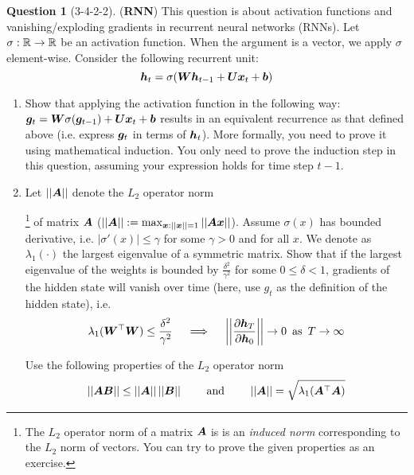 \documentclass[12pt]{article}
\theoremstyle{definition}
\newtheorem{exercise}{Question}%
\newcommand{\staritem}{
\addtocounter{enumi}{1}
\item[$\phantom{x}^{*}$\theenumi]}
\begin{document}
\begin{exercise} [3-4-2-2] (\textbf{RNN})
    \label{ex:rnn_spectral}
    This question is about activation functions and vanishing/exploding gradients in recurrent neural networks (RNNs). Let $\sigma:\mathbb{R}\rightarrow\mathbb{R}$ be an activation function. 
    When the argument is a vector, we apply $\sigma$ element-wise. 
    Consider the following recurrent unit:
    $${\bm{h}}_t = \sigma({\bm{W}} {\bm{h}}_{t-1} + {\bm{U}}{\bm{x}}_t + {\bm{b}})$$
    \begin{enumerate}[label=\arabic{exercise}.\arabic*]
        \item Show that applying the activation function in the following way: ${\bm{g}}_t = {\bm{W}}\sigma({\bm{g}}_{t-1}) + {\bm{U}}{\bm{x}}_t + {\bm{b}}$ results  in an equivalent recurrence as that defined above (i.e. express ${\bm{g}}_t$ in terms of ${\bm{h}}_t$).
        More formally, you need to prove it using mathematical induction. 
        You only need to prove the induction step in this question, assuming your expression holds for time step $t-1$.
        \item
        Let $||{\bm{A}}||$ denote the $L_2$ operator norm
        
        \footnote{
        The $L_2$ operator norm of a matrix ${\bm{A}}$ is is an \textit{induced norm} corresponding to the $L_2$ norm of vectors. 
        You can try to prove the given properties as an exercise.
        }
        of matrix ${\bm{A}}$ ($||{\bm{A}}||:=\max_{{\bm{x}}:||{\bm{x}}||=1}||{\bm{A}}{\bm{x}}||$). 
        Assume $\sigma(x)$ has bounded derivative, i.e. $|\sigma'(x)|\leq \gamma$ for some $\gamma>0$ and for all $x$. We denote as $\lambda_1(\cdot)$ the largest eigenvalue of a symmetric matrix. Show that if the largest eigenvalue of the weights is bounded by $\frac{\delta^2}{\gamma^2}$ for some $0 \leq \delta < 1$, gradients of the hidden state will vanish over time (here, use $g_t$ as the definition of the hidden state),    
         i.e.  
        $$\lambda_1({\bm{W}}^\top{\bm{W}})\leq\frac{\delta^2}{\gamma^2} \quad\implies\quad \bigg{|}\bigg{|}\frac{\partial{\bm{h}}_T}{\partial{\bm{h}}_0}\bigg{|}\bigg{|}  \rightarrow0 \,\text{ as }\,T\rightarrow\infty$$
        
        Use the following properties of the $L_2$ operator norm 
        $$||{\bm{A}}{\bm{B}}||\leq||{\bm{A}}||\,||{\bm{B}}|| \qquad \text{ and } \qquad ||{\bm{A}}||=\sqrt{\lambda_1({\bm{A}}^\top{\bm{A}})}$$
        

\end{enumerate}
\end{exercise}
\end{document}
